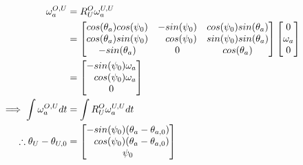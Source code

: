 \begin{equation}
\begin{aligned}
\omega^{O,U}_a&=R^O_U \omega^{U,U}_a \\
&=    \begin{bmatrix}
cos(\theta_a) cos(\psi_0) & -sin(\psi_0) & cos(\psi_0) sin(\theta_a) \\
cos(\theta_a) sin(\psi_0) & \hphantom{-} cos(\psi_0) & sin(\psi_0) sin(\theta_a)\\
-sin(\theta_a) & 0 & cos(\theta_a) 
\end{bmatrix}
\begin{bmatrix}
0 \\ \omega_a \\0
\end{bmatrix}\\
&=\begin{bmatrix}
-sin(\psi_0)\omega_a  \\ \hphantom{-} cos(\psi_0)\omega_a   \\0 %
\end{bmatrix} \\
%
\implies \int \omega^{O,U}_a dt&=\int R^O_U \omega^{U,U}_a dt \\
\therefore \theta_U-\theta_{U,0} &= 
\begin{bmatrix} 
-sin(\psi_0)(\theta_a-\theta_{a,0}) \\ \hphantom{-} cos(\psi_0)(\theta_a-\theta_{a,0}) \\ \psi_0
\end{bmatrix}
\end{aligned}
\end{equation}


